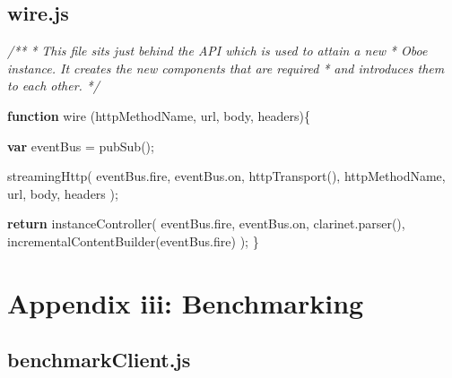 \documentclass[]{article}
\let\stdsection\section
\renewcommand\section{\newpage\stdsection}
\newenvironment{Shaded}{}{}
\newcommand{\KeywordTok}[1]{\textcolor[rgb]{0.00,0.44,0.13}{\textbf{{#1}}}}
\newcommand{\CommentTok}[1]{\textcolor[rgb]{0.38,0.63,0.69}{\textit{{#1}}}}
\newcommand{\OtherTok}[1]{\textcolor[rgb]{0.00,0.44,0.13}{{#1}}}
\newcommand{\FunctionTok}[1]{\textcolor[rgb]{0.02,0.16,0.49}{{#1}}}
\newcommand{\NormalTok}[1]{{#1}}
\begin{document}
\pagebreak

\subsection{wire.js}

\begin{Shaded}
\begin{Highlighting}[]
\CommentTok{/**}
\CommentTok{ * This file sits just behind the API which is used to attain a new}
\CommentTok{ * Oboe instance. It creates the new components that are required}
\CommentTok{ * and introduces them to each other.}
\CommentTok{ */}

\KeywordTok{function} \FunctionTok{wire} \NormalTok{(httpMethodName, url, body, headers)\{}

   \KeywordTok{var} \NormalTok{eventBus = }\FunctionTok{pubSub}\NormalTok{();}
               
   \FunctionTok{streamingHttp}\NormalTok{( }\OtherTok{eventBus}\NormalTok{.}\FunctionTok{fire}\NormalTok{, }\OtherTok{eventBus}\NormalTok{.}\FunctionTok{on}\NormalTok{,}
                  \FunctionTok{httpTransport}\NormalTok{(), }
                  \NormalTok{httpMethodName, url, body, headers );                              }
     
   \KeywordTok{return} \FunctionTok{instanceController}\NormalTok{( }
               \OtherTok{eventBus}\NormalTok{.}\FunctionTok{fire}\NormalTok{, }\OtherTok{eventBus}\NormalTok{.}\FunctionTok{on}\NormalTok{, }
               \OtherTok{clarinet}\NormalTok{.}\FunctionTok{parser}\NormalTok{(), }
               \FunctionTok{incrementalContentBuilder}\NormalTok{(}\OtherTok{eventBus}\NormalTok{.}\FunctionTok{fire}\NormalTok{) }
   \NormalTok{);}
\NormalTok{\}}
\end{Highlighting}
\end{Shaded}

\section{Appendix iii: Benchmarking}

\subsection{benchmarkClient.js}
\end{document}
